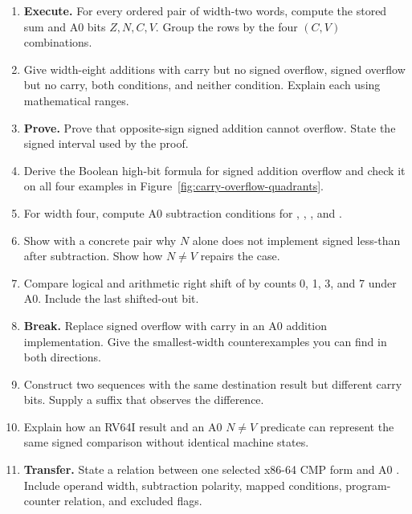 \begin{enumerate}
\item \textbf{Execute.} For every ordered pair of width-two words, compute the
stored sum and A0 bits \(Z,N,C,V\). Group the rows by the four \((C,V)\)
combinations.

\item Give width-eight additions with carry but no signed overflow, signed
overflow but no carry, both conditions, and neither condition. Explain each
using mathematical ranges.

\item \textbf{Prove.} Prove that opposite-sign signed addition cannot overflow.
State the signed interval used by the proof.

\item Derive the Boolean high-bit formula for signed addition overflow and
check it on all four examples in Figure~\ref{fig:carry-overflow-quadrants}.

\item For width four, compute A0 subtraction conditions for
, , , and
.

\item Show with a concrete pair why \(N\) alone does not implement signed
less-than after subtraction. Show how \(N\ne V\) repairs the case.

\item Compare logical and arithmetic right shift of  by
counts 0, 1, 3, and 7 under A0. Include the last shifted-out bit.

\item \textbf{Break.} Replace signed overflow with carry in an A0 addition
implementation. Give the smallest-width counterexamples you can find in both
directions.

\item Construct two sequences with the same destination result but different
carry bits. Supply a suffix that observes the difference.

\item Explain how an RV64I  result and an A0 \(N\ne V\) predicate
can represent the same signed comparison without identical machine states.

\item \textbf{Transfer.} State a relation between one selected x86-64 CMP
form and A0 . Include operand width, subtraction polarity, mapped
conditions, program-counter relation, and excluded flags.


\end{enumerate}
